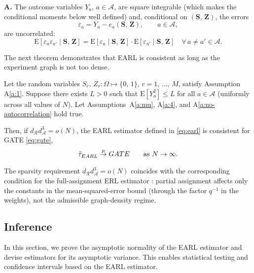 \documentclass[sigconf,nonacm]{acmart}
\newcounter{assumption}
\newenvironment{assumption}{\refstepcounter{assumption}\par\medskip\noindent\textbf{A\theassumption.}\enspace}{\par\medskip}
\newcommand{\E}{\mathrm E}
\begin{document}
\begin{assumption}\label{a:no-autocorrelation} The outcome variables $Y_a$, $a\in\mathcal A$, are square integrable (which makes the conditional moments below well defined) and, conditional on $(\mathbf S,\,\mathbf Z)$, the errors
\begin{equation}\label{def:epsa}
    \varepsilon_a = Y_a - e_a(\mathbf{S},\,\mathbf{Z}),\qquad a\in\mathcal{A},
\end{equation}
are uncorrelated:
\begin{equation*}
    \E[\varepsilon_a \varepsilon_{a'}\mid \mathbf{S},\,\mathbf{Z}] = \E[\varepsilon_a\mid \mathbf{S},\,\mathbf{Z}] \cdot \E[\varepsilon_{a'}\mid \mathbf{S},\,\mathbf{Z}]\quad \forall\,a\neq a'\in\mathcal{A}.
\end{equation*}
\end{assumption}

The next theorem demonstrates that EARL is consistent as long as the experiment graph is not too dense.
\begin{theorem}\label{th:consistency}
    Let the random variables $S_r,\,Z_r\colon\Omega\mapsto\{0,\,1\}$, $r=1,\,\ldots,\,M$, satisfy Assumption A\ref{a:1}. Suppose there exists $L>0$ such that $\E[Y_a^2] \le L$ for all $a\in\mathcal A$ (uniformly across all values of $N$). Let Assumptions~A\ref{a:mu}, A\ref{a:4}, and A\ref{a:no-autocorrelation} hold true.

    Then, if $d^{\phantom{1}}_{\mathcal{R}}d^3_{\mathcal{A}}=o(N)$, the EARL estimator defined in \eqref{eq:earl} is consistent for GATE \eqref{eq:gate},
    \begin{equation*}
        \hat\tau^{\phantom{1}}_{EARL} \stackrel{p}{\to} GATE\qquad \textup{as }N\to\infty.
    \end{equation*}
\end{theorem}

The sparsity requirement $d_{\mathcal R}^{\phantom{1}}d_{\mathcal A}^3=o(N)$ coincides with the corresponding condition for the full-assignment ERL estimator \cite[Theorem~4.2]{harshaw2023erl}: partial assignment affects only the constants in the mean-squared-error bound (through the factor $q^{-1}$ in the weights), not the admissible graph-density regime.

\subsection{Inference}\label{subsec:inference}
In this section, we prove the asymptotic normality of the EARL estimator and devise estimators for its asymptotic variance. This enables statistical testing and confidence intervals based on the EARL estimator.
\end{document}
